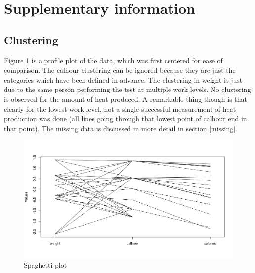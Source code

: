 \documentclass[11pt, a4paper]{article}
\begin{document}
 


\newpage

\appendix
\section{Supplementary information}
\subsection{Clustering}
Figure \ref{fig:spaghettiplot} is a profile plot of the data, which
was first centered for ease of comparison. The calhour clustering can
be ignored because they are just the categories which have been
defined in advance. The clustering in weight is just due to the same
person performing the test at multiple work levels. No clustering is
observed for the amount of heat produced. A remarkable thing though is
that clearly for the lowest work level, not a single successful
measurement of heat production was done (all lines going through that
lowest point of calhour end in that point). The missing data is
discussed in more detail in section \ref{missing}.
\begin{figure}[H]
    \centering
    \includegraphics[scale=.5]{spaghettiplot.png}
    \caption{Spaghetti plot}
    \label{fig:spaghettiplot}
\end{figure}
\end{document}
